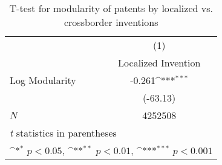 \begin{table}[htbp]\centering
\def\sym#1{\ifmmode^{#1}\else\(^{#1}\)\fi}
\caption{T-test for modularity of patents by localized vs. crossborder inventions\label{a1}}
\begin{tabular}{l*{1}{c}}
\hline\hline
            &\multicolumn{1}{c}{(1)}\\
            &\multicolumn{1}{c}{Localized Invention}\\
\hline
Log Modularity        &      -0.261\sym{***}\\
            &    (-63.13)         \\
\hline
\(N\)       &     4252508         \\
\hline\hline
\multicolumn{2}{l}{\footnotesize \textit{t} statistics in parentheses}\\
\multicolumn{2}{l}{\footnotesize \sym{*} \(p<0.05\), \sym{**} \(p<0.01\), \sym{***} \(p<0.001\)}\\
\end{tabular}
\end{table}
